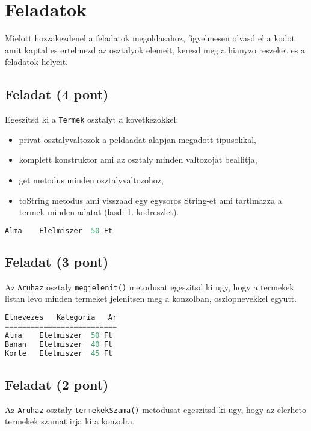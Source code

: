 \documentclass{article}
\begin{document}
\section{Feladatok}

Mielott hozzakezdenel a feladatok megoldasahoz, figyelmesen olvasd el a kodot amit kaptal es ertelmezd az osztalyok elemeit, keresd meg a hianyzo reszeket es a feladatok helyeit.

\subsection{Feladat (4 pont)}
Egeszitsd ki a \lstinline{Termek} osztalyt a kovetkezokkel:
\begin{itemize}
    \item privat osztalyvaltozok a peldaadat alapjan megadott tipusokkal,
    \item komplett konstruktor ami az osztaly minden valtozojat beallitja,
    \item get metodus minden osztalyvaltozohoz,
    \item toString metodus ami visszaad egy egysoros String-et ami tartlmazza a termek minden adatat (lasd: 1. kodreszlet).
\end{itemize}

\begin{lstlisting}[language=Java, caption=Pelda Termek.toString() eredmeny]
Alma    Elelmiszer  50 Ft
\end{lstlisting}

\subsection{Feladat (3 pont)}
Az \lstinline{Aruhaz} osztaly \lstinline{megjelenit()} metodusat egeszitsd ki ugy, hogy a termekek listan levo minden termeket jelenitsen meg a konzolban, oszlopnevekkel egyutt.

\begin{lstlisting}[language=Java, caption=Pelda Aruhaz.megjelenit() kimenet]
Elnevezes   Kategoria   Ar
==========================
Alma    Elelmiszer  50 Ft
Banan   Elelmiszer  40 Ft
Korte   Elelmiszer  45 Ft
\end{lstlisting}

\subsection{Feladat (2 pont)}

Az \lstinline{Aruhaz} osztaly \lstinline{termekekSzama()} metodusat egeszitsd ki ugy, hogy az elerheto termekek szamat irja ki a konzolra.
\end{document}
